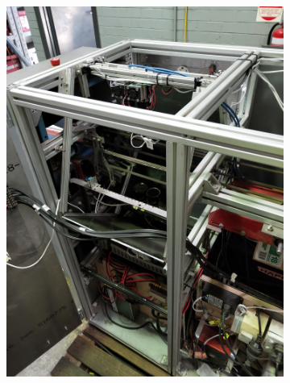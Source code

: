 \documentclass[fleqn,twoside,12pt]{report}
\begin{document}
\begin{figure}[h]
\begin{subfigure}{.25\textwidth}
		\caption{}
		\label{fig:clean_2}
	\end{subfigure}%
	\begin{subfigure}{.25\textwidth}
		\centering
		\includegraphics[width=0.9\linewidth]{clean_3.jpg}
		\caption{}
		\label{fig:clean_3}
	\end{subfigure}%
	\begin{subfigure}{.25\textwidth}
		\centering

\end{subfigure}
\end{figure}
\end{document}
